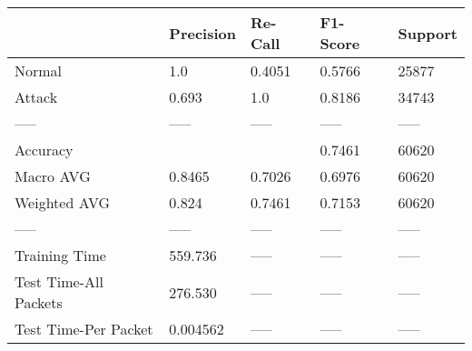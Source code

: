 \begin{tabular}{lllll}
\toprule
{} & Precision & Re-Call & F1-Score & Support \\
\midrule
Normal                &       1.0 &  0.4051 &   0.5766 &   25877 \\
Attack                &     0.693 &     1.0 &   0.8186 &   34743 \\
-----                 &     ----- &   ----- &    ----- &   ----- \\
Accuracy              &           &         &   0.7461 &   60620 \\
Macro AVG             &    0.8465 &  0.7026 &   0.6976 &   60620 \\
Weighted AVG          &     0.824 &  0.7461 &   0.7153 &   60620 \\
-----                 &     ----- &   ----- &    ----- &   ----- \\
Training Time         &   559.736 &   ----- &    ----- &   ----- \\
Test Time-All Packets &   276.530 &   ----- &    ----- &   ----- \\
Test Time-Per Packet  &  0.004562 &   ----- &    ----- &   ----- \\
\bottomrule
\end{tabular}
